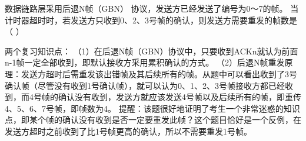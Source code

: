 \question 数据链路层采用后退N帧（GBN） 协议，发送方已经发送了编号为0～7的帧。
当计时器超时时，若发送方只收到0、2、3号帧的确认，则发送方需要重发的帧数是（
）
\par{}
\begin{solution}两个复习知识点：
（1）在后退N帧（GBN）协议中，只要收到ACKn就认为前面n-1帧一定全部收到，即默认接收方采用累积确认的方式。
（2）后退N帧重发原理：发送方超时后需重发该出错帧及其后续所有的帧。从题中可以看出收到了3号确认帧（尽管没有收到1号确认帧），就可以认为0、1、2、3号帧接收方都已经收到，而4号帧的确认没有收到，发送方就应该发送4号帧以及后续所有的帧，即重传4、5、6、7号帧，即帧数为4。
提醒：该题很好地证明了考生一个非常迷惑的知识点，即某个帧的确认没有收到是否一定要重发此帧？这个题目恰好是一个反例，在发送方超时之前收到了比1号帧更高的确认，所以不需要重发1号帧。
\end{solution}

